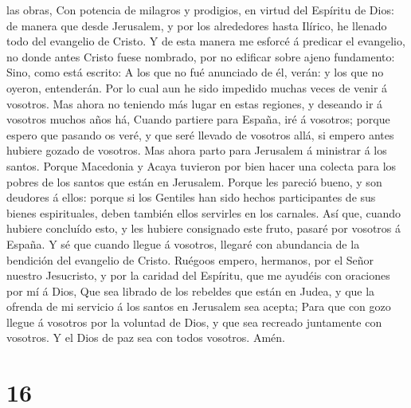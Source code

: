 las obras,  Con potencia de milagros y prodigios, en virtud
del Espíritu de Dios: de manera que desde Jerusalem, y por los
alrededores hasta Ilírico, he llenado todo del evangelio de Cristo.
 Y de esta manera me esforcé á predicar el evangelio, no
donde antes Cristo fuese nombrado, por no edificar sobre ajeno
fundamento:  Sino, como está escrito: A los que no fué
anunciado de él, verán: y los que no oyeron, entenderán. 
Por lo cual aun he sido impedido muchas veces de venir á vosotros.
 Mas ahora no teniendo más lugar en estas regiones, y
deseando ir á vosotros muchos años há,  Cuando partiere
para España, iré á vosotros; porque espero que pasando os veré, y que
seré llevado de vosotros allá, si empero antes hubiere gozado de
vosotros.  Mas ahora parto para Jerusalem á ministrar á los
santos.  Porque Macedonia y Acaya tuvieron por bien hacer
una colecta para los pobres de los santos que están en Jerusalem.
 Porque les pareció bueno, y son deudores á ellos: porque
si los Gentiles han sido hechos participantes de sus bienes
espirituales, deben también ellos servirles en los carnales.
 Así que, cuando hubiere concluído esto, y les hubiere
consignado este fruto, pasaré por vosotros á España.  Y sé
que cuando llegue á vosotros, llegaré con abundancia de la bendición del
evangelio de Cristo.  Ruégoos empero, hermanos, por el
Señor nuestro Jesucristo, y por la caridad del Espíritu, que me ayudéis
con oraciones por mí á Dios,  Que sea librado de los
rebeldes que están en Judea, y que la ofrenda de mi servicio á los
santos en Jerusalem sea acepta;  Para que con gozo llegue á
vosotros por la voluntad de Dios, y que sea recreado juntamente con
vosotros.  Y el Dios de paz sea con todos vosotros. Amén.

\hypertarget{section-15}{%
\section{16}\label{section-15}}

